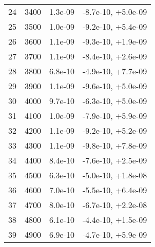 \begin{table}
\begin{adjustbox}{width=1\textwidth/2}
\begin{tabular}{|c|c|c|c|}
\cline{1-4}
24 & 3400 & 1.3e-09 & -8.7e-10, +5.0e-09 \\
\cline{1-4}
25 & 3500 & 1.0e-09 & -9.2e-10, +5.4e-09 \\
\cline{1-4}
26 & 3600 & 1.1e-09 & -9.3e-10, +1.9e-09 \\
\cline{1-4}
27 & 3700 & 1.1e-09 & -8.4e-10, +2.6e-09 \\
\cline{1-4}
28 & 3800 & 6.8e-10 & -4.9e-10, +7.7e-09 \\
\cline{1-4}
29 & 3900 & 1.1e-09 & -9.6e-10, +5.0e-09 \\
\cline{1-4}
30 & 4000 & 9.7e-10 & -6.3e-10, +5.0e-09 \\
\cline{1-4}
31 & 4100 & 1.0e-09 & -7.9e-10, +5.9e-09 \\
\cline{1-4}
32 & 4200 & 1.1e-09 & -9.2e-10, +5.2e-09 \\
\cline{1-4}
33 & 4300 & 1.1e-09 & -9.8e-10, +7.8e-09 \\
\cline{1-4}
34 & 4400 & 8.4e-10 & -7.6e-10, +2.5e-09 \\
\cline{1-4}
35 & 4500 & 6.3e-10 & -5.0e-10, +1.8e-08 \\
\cline{1-4}
36 & 4600 & 7.0e-10 & -5.5e-10, +6.4e-09 \\
\cline{1-4}
37 & 4700 & 8.0e-10 & -6.7e-10, +2.2e-08 \\
\cline{1-4}
38 & 4800 & 6.1e-10 & -4.4e-10, +1.5e-09 \\
\cline{1-4}
39 & 4900 & 6.9e-10 & -4.7e-10, +5.9e-09 \\
\cline{1-4}
\end{tabular}
\end{adjustbox}
\end{table}

